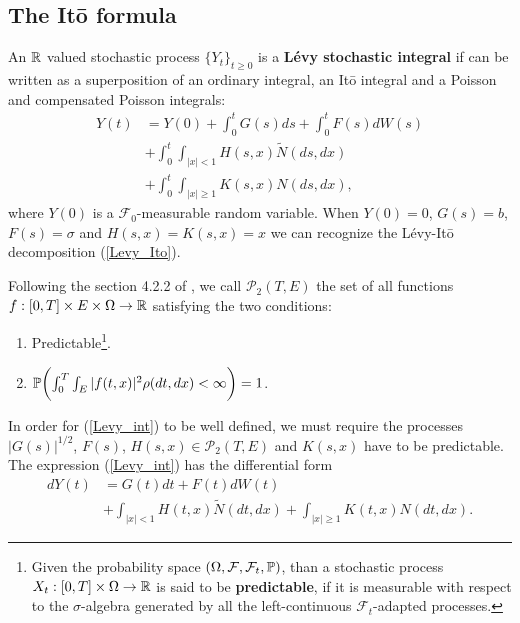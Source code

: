 \subsection{The It\={o} formula}

An $\mathbb{R}$ valued stochastic process $\{Y_t\}_{t \ge 0}$ is a \textbf{Lévy stochastic integral} if can be written as a superposition of
an ordinary integral, an It\={o} integral and a Poisson and compensated Poisson integrals:
\begin{align} \label{Levy_int}
 Y(t) &= Y(0) + \int_0^{t} G(s) ds  + \int_0^{t} F(s) dW(s)\\ \nonumber
     &+ \int_0^{t} \int_{|x|<1} H(s,x) \tilde N (ds,dx)\\ \nonumber
     &+ \int_0^{t} \int_{|x|\geq 1} K(s,x) N(ds,dx),
\end{align}
where $Y(0)$ is a $\mathcal{F}_0$-measurable random variable.
When $Y(0)=0$, $G(s)=b$, $F(s)= \sigma$ and $H(s,x)=K(s,x) = x$ we can recognize the Lévy-It\={o} 
decomposition (\ref{Levy_Ito}).

Following the section 4.2.2 of \cite{Applebaum}, we call $\mathcal{P}_2(T,E)$ the set of all functions $f:[0,T]\times E \times \Omega \to \mathbb{R}$ satisfying the two conditions:
\begin{enumerate}
 \item Predictable\footnote{Given the probability space $(\Omega,\mathcal{F},\mathcal{F}_t,\mathbb{P})$, than a stochastic process
 $X_t : [0,T] \times \Omega \to \mathbb{R}$ is said to be \textbf{predictable}, if it is measurable with respect to the $\sigma$-algebra generated 
 by all the left-continuous $\mathcal{F}_t$-adapted processes.}.
 \item  $\mathbb{P} \biggl( \int_0^T \int_E |f(t,x)|^2 \rho(dt,dx) <\infty \biggr) =1 $.
\end{enumerate}
In order for (\ref{Levy_int}) to be well defined, we must require the processes $|G(s)|^{1/2}$, $F(s)$, $H(s,x) \in \mathcal{P}_2(T,E)$ and $K(s,x)$ have to be predictable.
The expression (\ref{Levy_int}) has the differential form
\begin{align} \label{Levy_diff}
 dY(t) &= G(t) dt  + F(t) dW(t)\\ \nonumber
     &+ \int_{|x|<1} H(t,x) \tilde N (dt,dx) + \int_{|x|\geq 1} K(t,x) N(dt,dx).
\end{align}

